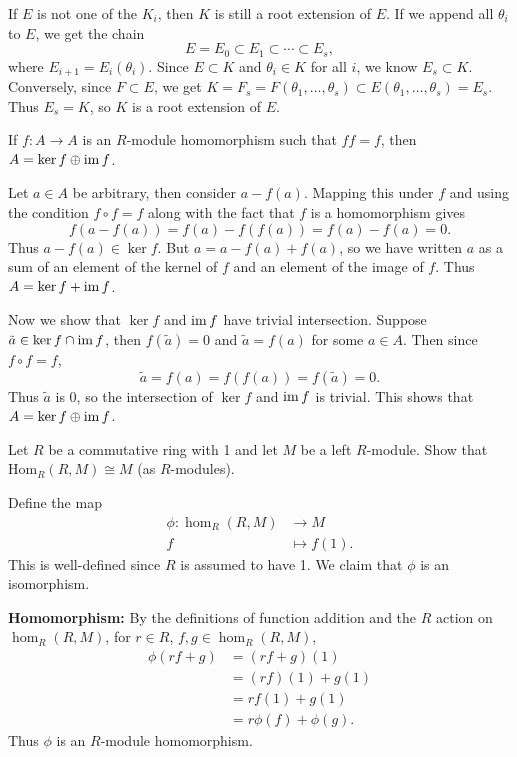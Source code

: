 \documentclass[twoside,10pt]{report}
\begin{document}
If $E$ is not one of the $K_i$, then $K$ is still a root extension of $E$. If we append all $\theta_i$ to $E$, we get the chain
\[
E = E_0 \subset E_1 \subset \cdots \subset E_s,
\] where $E_{i+1}=E_i(\theta_i)$. Since $E \subset K$ and $\theta_i \in K$ for all $i$, we know $E_s \subset K$. Conversely, since $F \subset E$, we get $K = F_s =F(\theta_1,\dots,\theta_s)\subset E(\theta_1,\dots,\theta_s)=E_s$. Thus $E_s=K$, so $K$ is a root extension of $E$.

\newpage
\begin{exer}[]
If $f:A\to A$ is an $R$-module homomorphism such that $ff=f$, then $A = \ker f \oplus \operatorname{im} f$.
\end{exer}
Let $a \in A$ be arbitrary, then consider $a-f(a)$. Mapping this under $f$ and using the condition $f \circ f=f$ along with the fact that $f$ is a homomorphism gives
\[
	f(a-f(a)) = f(a) - f(f(a)) = f(a)-f(a)=0.
\] Thus $a-f(a) \in \ker f$. But $a=a-f(a)+f(a)$, so we have written $a$ as a sum of an element of the kernel of $f$ and an element of the image of $f$. Thus $A = \ker f + \operatorname{im} f$.

Now we show that $\ker f$ and $\operatorname{im} f$ have trivial intersection. Suppose $\tilde{a} \in \ker f \cap \operatorname{im} f$, then $f(\tilde{a})=0$ and $\tilde{a}=f(a)$ for some $a \in A$. Then since $f\circ f=f$,
\[
	\tilde{a} = f(a) = f(f(a)) = f(\tilde{a}) = 0.
\] 
Thus $\tilde{a}$ is 0, so the intersection of $\ker f$ and $\operatorname{im} f$ is trivial. This shows that $A = \ker f \oplus \operatorname{im} f$.

\newpage
\begin{exer}[]
	Let $R$ be a commutative ring with 1 and let $M$ be a left $R$-module. Show that $\text{Hom}_{R}(R,M) \cong M$ (as $R$-modules).
\end{exer}
Define the map
\begin{align*}
	\phi:\hom_{R}(R,M) &\to M \\
	f&\mapsto f(1).
\end{align*}
This is well-defined since $R$ is assumed to have 1. We claim that $\phi$ is an isomorphism.

\textbf{Homomorphism:} By the definitions of function addition and the $R$ action on $\hom_{R}(R,M)$, for $r \in R$, $f,g \in \hom_R(R,M)$,
\begin{align*}
	\phi(rf+g) &= (rf+g)(1) \\
			    &= (rf)(1)+g(1) \\
			    &= rf(1)+g(1) \\
			    &= r\phi(f)+\phi(g).
\end{align*}
Thus $\phi$ is an $R$-module homomorphism.
\end{document}
